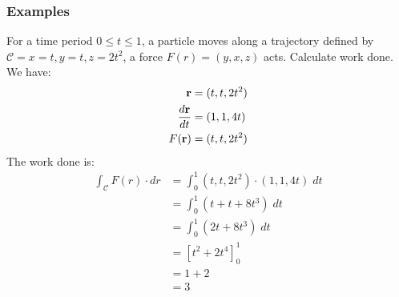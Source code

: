 \documentclass[a4paper, 10pt]{article}
\begin{document}
\pagebreak
\subsubsection{Examples}
\begin{examplebox}{For a time period $0 \leq t \leq 1$, a particle moves along a trajectory defined by $\mathcal{C} = x = t, y = t, z = 2t^2$, a force $F(r) = (y,x,z)$ acts. Calculate work done.}{}
  We have:
  \begin{align*}
    \mathbf{r}           & = (t,t,2t^2) \\
    \frac{d\mathbf{r}}{dt} & = (1,1,4t)   \\
    F(\mathbf{r})        & = (t,t,2t^2)
  \end{align*}
  The work done is:
  \begin{align*}
    \int_{\mathcal{C}} F(r) \cdot dr & = \int_{0}^{1} (t,t,2t^2) \cdot (1,1,4t) \; dt \\
                                     & = \int_{0}^{1} (t + t + 8t^3) \; dt            \\
                                     & = \int_{0}^{1} (2t + 8t^3) \; dt               \\
                                     & = \left[t^2 + 2t^4\right]_0^1                  \\
                                     & = 1 + 2                                        \\
                                     & = 3
  \end{align*}
\end{examplebox}
\end{document}
